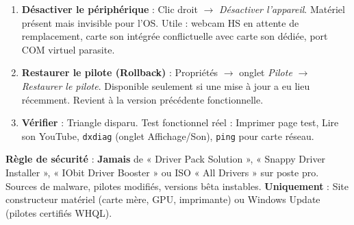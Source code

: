 \documentclass[11pt]{article}
\begin{document}
\begin{methode}
\begin{enumerate}
\item \textbf{Désactiver le périphérique} : Clic droit $\rightarrow$ \emph{Désactiver l'appareil}. Matériel présent mais invisible pour l'OS. Utile : webcam HS en attente de remplacement, carte son intégrée conflictuelle avec carte son dédiée, port COM virtuel parasite.
\item \textbf{Restaurer le pilote (Rollback)} : Propriétés $\rightarrow$ onglet \emph{Pilote} $\rightarrow$ \emph{Restaurer le pilote}. Disponible seulement si une mise à jour a eu lieu récemment. Revient à la version précédente fonctionnelle.
\item \textbf{Vérifier} : Triangle disparu. Test fonctionnel réel : Imprimer page test, Lire son YouTube, \texttt{dxdiag} (onglet Affichage/Son), \texttt{ping} pour carte réseau.
\end{enumerate}
\textbf{Règle de sécurité} : \textbf{Jamais} de « Driver Pack Solution », « Snappy Driver Installer », « IObit Driver Booster » ou ISO « All Drivers » sur poste pro. Sources de malware, pilotes modifiés, versions bêta instables. \textbf{Uniquement} : Site constructeur matériel (carte mère, GPU, imprimante) ou Windows Update (pilotes certifiés WHQL).
\end{methode}
\end{document}
